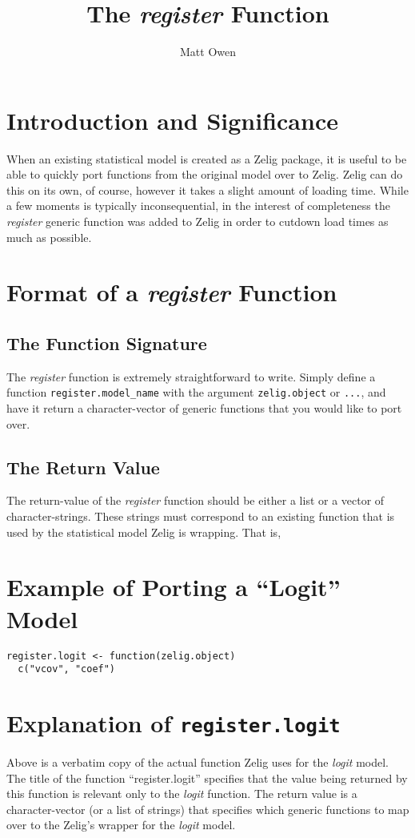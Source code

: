 \documentclass[a4paper,10pt]{article}
\begin{document}
\title{The \emph{register} Function}
\author{Matt Owen}
\maketitle



\section{Introduction and Significance}
When an existing statistical model is created as a Zelig package, it is useful to be able to quickly port functions from the original model over to Zelig.  Zelig can do this on its own, of course, however it takes a slight amount of loading time.  While a few moments is typically inconsequential, in the interest of completeness the \emph{register} generic function was added to Zelig in order to cutdown load times as much as possible.

\section{Format of a \emph{register} Function}

\subsection{The Function Signature}
The \emph{register} function is extremely straightforward to write.  Simply define a function {\tt register.model\_name} with the argument {\tt zelig.object} or {\tt ...}, and have it return a character-vector of generic functions that you would like to port over.

\subsection{The Return Value}
The return-value of the \emph{register} function should be either a list or a vector of character-strings.  These strings must correspond to an existing function that is used by the statistical model Zelig is wrapping.  That is, 



\section{Example of Porting a ``Logit'' Model}

\begin{verbatim}
register.logit <- function(zelig.object)
  c("vcov", "coef")
\end{verbatim}



\section{Explanation of {\tt register.logit}}
Above is a verbatim copy of the actual function Zelig uses for the \emph{logit} model.  The title of the function ``register.logit'' specifies that the value being returned by this function is relevant only to the \emph{logit} function.  The return value is a character-vector (or a list of strings) that specifies which generic functions to map over to the Zelig's wrapper for the \emph{logit} model.
\end{document}

